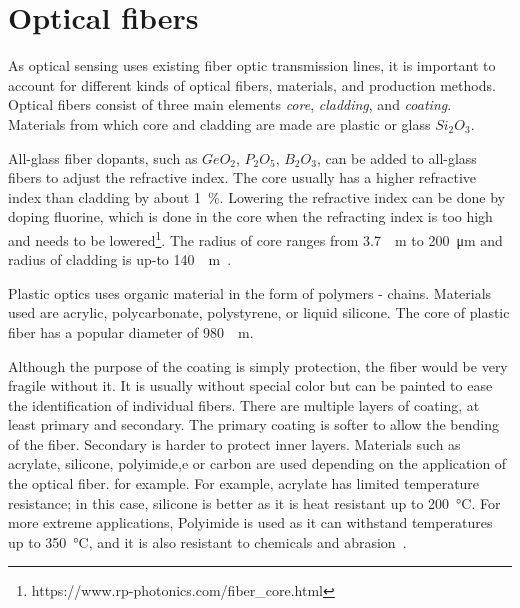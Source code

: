 \section{Optical fibers}\label{txt.optical.fibers}


As optical sensing uses existing fiber optic transmission lines, it is important to account for different kinds of optical fibers, materials, and production methods. Optical fibers consist of three main elements \textit{core}, \textit{cladding}, and \textit{coating}. Materials from which core and cladding are made are plastic or glass $Si_2O_3$. 

All-glass fiber dopants, such as $GeO_2$, $P_2O_5$, $B_2O_3$, can be added to all-glass fibers to adjust the refractive index. The core usually has a higher refractive index than cladding by about \qty{1}{\si{\percent}}. Lowering the refractive index can be done by doping fluorine, which is done in the core when the refracting index is too high and needs to be lowered\footnote{https://www.rp-photonics.com/fiber\_core.html}. The radius of core ranges from \qty{3.7}{\si{\micro}\meter} to \qty{200}{\micro\meter} and radius of cladding is up-to \qty{140}{\si{\micro}\meter}~\cite{cabling}.

Plastic optics uses organic material in the form of polymers - chains. Materials used are acrylic, polycarbonate, polystyrene, or liquid silicone. The core of plastic fiber has a popular diameter of \qty{980}{\si{\micro}\meter}.

Although the purpose of the coating is simply protection, the fiber would be very fragile without it. It is usually without special color but can be painted to ease the identification of individual fibers. There are multiple layers of coating, at least primary and secondary. The primary coating is softer to allow the bending of the fiber. Secondary is harder to protect inner layers. Materials such as acrylate, silicone, polyimide,e or carbon are used depending on the application of the optical fiber. for example. For example, acrylate has limited temperature resistance; in this case, silicone is better as it is heat resistant up to \qty{200}{\celsius}\cite{cabling}. For more extreme applications, Polyimide is used as it can withstand temperatures up to \qty{350}{\celsius}, and it is also resistant to chemicals and abrasion~\cite{cabling}.


